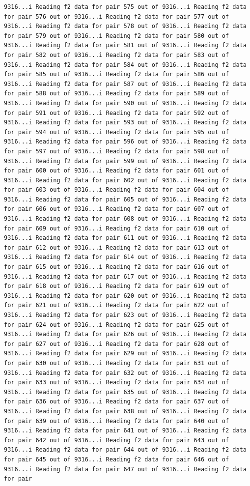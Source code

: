\documentclass[
]{article}
\begin{document}
\begin{verbatim}
9316...i Reading f2 data for pair 575 out of 9316...i Reading f2 data for pair 576 out of 9316...i Reading f2 data for pair 577 out of 9316...i Reading f2 data for pair 578 out of 9316...i Reading f2 data for pair 579 out of 9316...i Reading f2 data for pair 580 out of 9316...i Reading f2 data for pair 581 out of 9316...i Reading f2 data for pair 582 out of 9316...i Reading f2 data for pair 583 out of 9316...i Reading f2 data for pair 584 out of 9316...i Reading f2 data for pair 585 out of 9316...i Reading f2 data for pair 586 out of 9316...i Reading f2 data for pair 587 out of 9316...i Reading f2 data for pair 588 out of 9316...i Reading f2 data for pair 589 out of 9316...i Reading f2 data for pair 590 out of 9316...i Reading f2 data for pair 591 out of 9316...i Reading f2 data for pair 592 out of 9316...i Reading f2 data for pair 593 out of 9316...i Reading f2 data for pair 594 out of 9316...i Reading f2 data for pair 595 out of 9316...i Reading f2 data for pair 596 out of 9316...i Reading f2 data for pair 597 out of 9316...i Reading f2 data for pair 598 out of 9316...i Reading f2 data for pair 599 out of 9316...i Reading f2 data for pair 600 out of 9316...i Reading f2 data for pair 601 out of 9316...i Reading f2 data for pair 602 out of 9316...i Reading f2 data for pair 603 out of 9316...i Reading f2 data for pair 604 out of 9316...i Reading f2 data for pair 605 out of 9316...i Reading f2 data for pair 606 out of 9316...i Reading f2 data for pair 607 out of 9316...i Reading f2 data for pair 608 out of 9316...i Reading f2 data for pair 609 out of 9316...i Reading f2 data for pair 610 out of 9316...i Reading f2 data for pair 611 out of 9316...i Reading f2 data for pair 612 out of 9316...i Reading f2 data for pair 613 out of 9316...i Reading f2 data for pair 614 out of 9316...i Reading f2 data for pair 615 out of 9316...i Reading f2 data for pair 616 out of 9316...i Reading f2 data for pair 617 out of 9316...i Reading f2 data for pair 618 out of 9316...i Reading f2 data for pair 619 out of 9316...i Reading f2 data for pair 620 out of 9316...i Reading f2 data for pair 621 out of 9316...i Reading f2 data for pair 622 out of 9316...i Reading f2 data for pair 623 out of 9316...i Reading f2 data for pair 624 out of 9316...i Reading f2 data for pair 625 out of 9316...i Reading f2 data for pair 626 out of 9316...i Reading f2 data for pair 627 out of 9316...i Reading f2 data for pair 628 out of 9316...i Reading f2 data for pair 629 out of 9316...i Reading f2 data for pair 630 out of 9316...i Reading f2 data for pair 631 out of 9316...i Reading f2 data for pair 632 out of 9316...i Reading f2 data for pair 633 out of 9316...i Reading f2 data for pair 634 out of 9316...i Reading f2 data for pair 635 out of 9316...i Reading f2 data for pair 636 out of 9316...i Reading f2 data for pair 637 out of 9316...i Reading f2 data for pair 638 out of 9316...i Reading f2 data for pair 639 out of 9316...i Reading f2 data for pair 640 out of 9316...i Reading f2 data for pair 641 out of 9316...i Reading f2 data for pair 642 out of 9316...i Reading f2 data for pair 643 out of 9316...i Reading f2 data for pair 644 out of 9316...i Reading f2 data for pair 645 out of 9316...i Reading f2 data for pair 646 out of 9316...i Reading f2 data for pair 647 out of 9316...i Reading f2 data for pair 
\end{verbatim}
\end{document}
